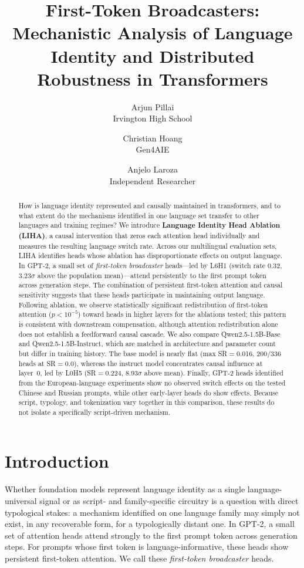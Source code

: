 \documentclass[11pt]{article}
\title{First-Token Broadcasters: Mechanistic Analysis of Language Identity
and Distributed Robustness in Transformers}
\author{
  Arjun Pillai \\
  \small Irvington High School
  \and
  Christian Hoang \\
  \small Gen4AIE
  \and
  Anjelo Laroza \\
  \small Independent Researcher
}
\begin{document}
\maketitle

\begin{abstract}
How is language identity represented and causally maintained in transformers,
and to what extent do the mechanisms identified in one language set transfer
to other languages and training regimes? We introduce \textbf{Language
Identity Head Ablation (LIHA)}, a causal intervention that zeros each
attention head individually and measures the resulting language switch rate.
Across our multilingual evaluation sets, LIHA identifies heads whose ablation
has disproportionate effects on output language. In GPT-2, a small set of
\emph{first-token broadcaster} heads---led by L6H1 (switch rate 0.32,
3.23$\sigma$ above the population mean)---attend persistently to the first
prompt token across generation steps. The combination of persistent
first-token attention and causal sensitivity suggests that these heads
participate in maintaining output language. Following ablation, we observe
statistically significant redistribution of first-token attention
($p < 10^{-5}$) toward heads in higher layers for the ablations tested;
this pattern is consistent with downstream compensation, although attention
redistribution alone does not establish a feedforward causal cascade. We
also compare Qwen2.5-1.5B-Base and Qwen2.5-1.5B-Instruct, which are matched
in architecture and parameter count but differ in training history. The base
model is nearly flat (max SR$=$0.016, 200/336 heads at SR$=$0.0), whereas the
instruct model concentrates causal influence at layer~0, led by L0H5
(SR$=$0.224, 8.93$\sigma$ above mean). Finally, GPT-2 heads identified from
the European-language experiments show no observed switch effects on the
tested Chinese and Russian prompts, while other early-layer heads do show
effects. Because script, typology, and tokenization vary together in this
comparison, these results do not isolate a specifically script-driven
mechanism.
\end{abstract}

\section{Introduction}

Whether foundation models represent language identity as a single
language-universal signal or as script- and family-specific circuitry
is a question with direct typological stakes: a mechanism identified
on one language family may simply not exist, in any recoverable form,
for a typologically distant one. In GPT-2, a small set of attention heads attend strongly to the first
prompt token across generation steps. For prompts whose first token is
language-informative, these heads show persistent first-token attention. We
call these \emph{first-token broadcaster} heads.
\end{document}
